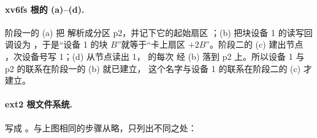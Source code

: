 \paragraph{xv6fs 根的 (a)--(d).} 阶段一的 (a) 把  解析成分区 p2，并记下它的起始扇区 ；(b)  把块设备 1 的读写回调设为 ，于是“设备 1 的块 $B$”就等于“卡上扇区 $+2B$”。阶段二的 (c) 建出节点 ，次设备号写 1；(d)  从节点读出 1， 的每次  经 (b) 落到 p2 上。所以设备 1 与 p2 的联系在阶段一的 (b) 就已建立， 这个名字与设备 1 的联系在阶段二的 (c) 才建立。

\paragraph{ext2 根文件系统.}  写成 。与上图相同的步骤从略，只列出不同之处：

